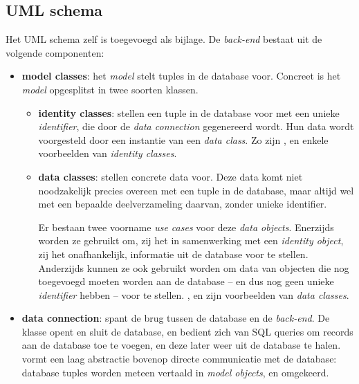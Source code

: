 \documentclass[12pt,a4paper,parskip=full]{article}
\begin{document}
\subsection{UML schema}

Het UML schema zelf is toegevoegd als bijlage. De \emph{back-end} bestaat uit de volgende componenten:

\begin{itemize}

\item \textbf{model classes}: het \emph{model} stelt tuples in de database voor. Concreet is het \emph{model} opgesplitst in twee soorten klassen.

\begin{itemize}

\item \textbf{identity classes}: stellen een tuple in de database voor met een unieke \emph{identifier}, die door de \emph{data connection} gegenereerd wordt. Hun data wordt voorgesteld door een instantie van een \emph{data class}. Zo zijn ,  en  enkele voorbeelden van \emph{identity classes}.

\item \textbf{data classes}: stellen concrete data voor. Deze data komt niet 
noodzakelijk precies overeen met een tuple in de database, maar altijd wel met 
een bepaalde deelverzameling daarvan, zonder unieke identifier.

Er bestaan twee voorname \emph{use cases} voor deze \emph{data objects}.
Enerzijds worden ze gebruikt om, zij het in samenwerking met een 
  \emph{identity object}, zij het onafhankelijk, informatie uit de database 
  voor te stellen.
Anderzijds kunnen ze ook gebruikt worden om data van objecten die nog 
  toegevoegd moeten worden aan de database -- en dus nog geen unieke 
  \emph{identifier} hebben -- voor te stellen. , 
   en  zijn voorbeelden van \emph{data 
  classes}.

\end{itemize}

\item \textbf{data connection}: spant de brug tussen de database en de \emph{back-end}. De  klasse opent en sluit de database, en bedient zich van SQL queries om records aan de database toe te voegen, en deze later weer uit de database te halen.  vormt een laag abstractie bovenop directe communicatie met de database: database tuples worden meteen vertaald in \emph{model objects}, en omgekeerd.


\end{itemize}
\end{document}
